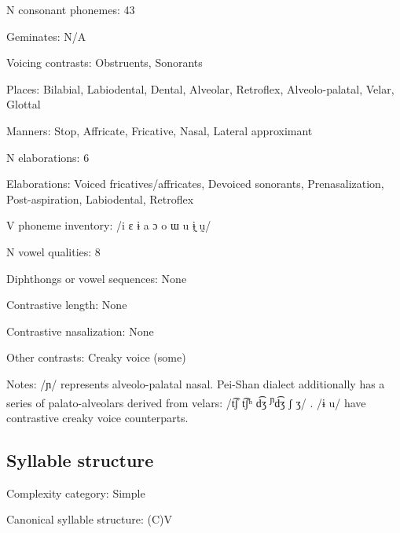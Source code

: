 {\begin{appendixdesc}
\item[N consonant phonemes:] 43

\item[Geminates:] N/A

\item[Voicing contrasts:] Obstruents, Sonorants

\item[Places:] Bilabial, Labiodental, Dental, Alveolar, Retroflex, Alveolo-palatal, Velar, Glottal

\item[Manners:] Stop, Affricate, Fricative, Nasal, Lateral approximant

\item[N elaborations:] 6

\item[Elaborations:] Voiced fricatives/affricates, Devoiced sonorants, Prenasalization, Post-aspiration, Labiodental, Retroflex

\item[V phoneme inventory:] /i ɛ ɨ a ɔ o ɯ u ɨ̰ ṵ/

\item[N vowel qualities:] 8

\item[Diphthongs or vowel sequences:] None

\item[Contrastive length:] None

\item[Contrastive nasalization:] None

\item[Other contrasts:] Creaky voice (some)

\item[Notes:] /ɲ/ represents alveolo-palatal nasal. Pei-Shan dialect additionally has a series of palato-alveolars derived from velars: /t͡ʃ t͡ʃʰ d͡ʒ \textsuperscript{ɲ}d͡ʒ ʃ ʒ/ \citep[68--69]{Maoji1997}. /ɨ u/ have contrastive creaky voice counterparts.
\end{appendixdesc}
\subsection*{Syllable structure}
\begin{appendixdesc}

\item[Complexity category:] Simple

\item[Canonical syllable structure:] (C)V \citep[30--32]{Gerner2013}


\end{appendixdesc}}
